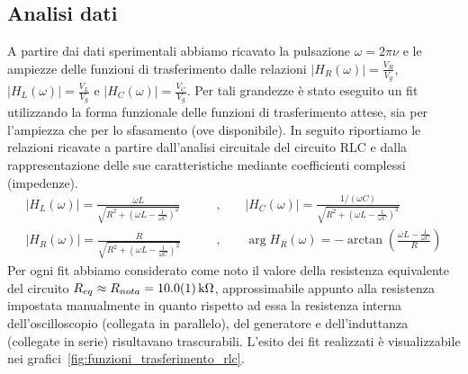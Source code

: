 \documentclass[a4paper]{article}
\begin{document}
\subsection{Analisi dati}
A partire dai dati sperimentali abbiamo ricavato la pulsazione $\omega = 2\pi \nu$ e le ampiezze delle funzioni di trasferimento dalle relazioni $|H_R(\omega)| = \frac{V_R}{V_g}$, $|H_L(\omega)| = \frac{V_L}{V_g}$ e $|H_C(\omega)| = \frac{V_C}{V_g}$.
Per tali grandezze è stato eseguito un fit utilizzando la forma funzionale delle funzioni di trasferimento attese, sia per l'ampiezza che per lo sfasamento (ove disponibile). In seguito riportiamo le relazioni ricavate a partire dall'analisi circuitale del circuito RLC e dalla rappresentazione delle sue caratteristiche mediante coefficienti complessi (impedenze).
\begin{align}
	 |H_L(\omega)| = \frac{\omega L}{\sqrt{R^2 + \left(\omega L-\frac{1}{\omega C}\right)^2}} \qquad & \text{,}\qquad |H_C(\omega)| = \frac{1/(\omega C)}{\sqrt{R^2 + \left(\omega L-\frac{1}{\omega C}\right)^2}} \label{eq:ampiezze VL, Vc RLC} \\
	 |H_R(\omega)| = \frac{R}{\sqrt{R^2 + \left(\omega L-\frac{1}{\omega C}\right)^2}} \qquad & \text{,}\qquad \arg H_R(\omega) = -\arctan\left(\frac{\omega L -\frac{1}{\omega C}}{R}\right) \label{eq:Vr_RLC}
\end{align}
Per ogni fit abbiamo considerato come noto il valore della resistenza equivalente del circuito $R_{eq} \approx R_{nota} = \SI{10.0 \pm 0.1}{k\ohm}$, approssimabile appunto alla resistenza impostata manualmente in quanto rispetto ad essa la resistenza interna dell'oscilloscopio (collegata in parallelo), del generatore e dell'induttanza (collegate in serie) risultavano trascurabili. L'esito dei fit realizzati è visualizzabile nei grafici~\ref{fig:funzioni_trasferimento_rlc}.
\end{document}
